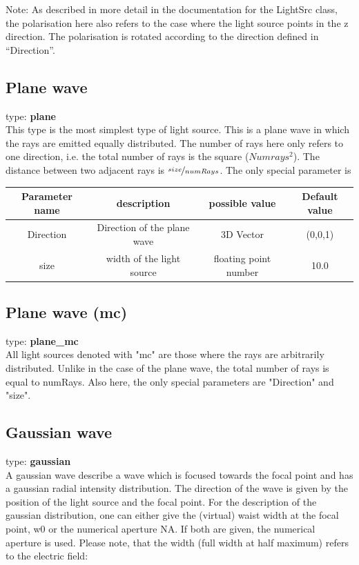 \documentclass[a4paper,html,11pt,openany]{book}
\begin{document}
 \vspace{1em} 
 Note: As described in more detail in the documentation for the LightSrc class, the polarisation here also refers to the case where the light source points in the z direction. The polarisation is rotated according to the direction defined in “Direction”. 
  \subsection{Plane wave}
  type: \textbf{plane} \\
 This type is the most simplest type of light source. This is a plane wave in which the rays are emitted equally distributed. The number of rays here only refers to one direction, i.e. the total number of rays is the square ($Numrays^2$). The distance between two adjacent rays is $\nicefrac{size}{numRays}$. The only special parameter is
  
\vspace{1em} 
  \begin{tabular}{c|c|c|c}
 Parameter name & description  & possible value & Default value \\
 \hline
 Direction & Direction of the plane wave & 3D Vector  & (0,0,1)\\
  \hline
  size & width of the light source  & floating point number & 10.0\\
 \end{tabular}
 
 \subsection{Plane wave (mc)} 
 type: \textbf{plane\_mc} \\
 All light sources denoted with "mc" are those where the rays are arbitrarily distributed. Unlike in the case of the plane wave, the total number of rays is equal to numRays. Also here, the only special parameters are "Direction" and "size". 
 
\subsection{Gaussian wave}
 type: \textbf{gaussian} \\
A gaussian wave describe a wave which is focused  towards the focal point and has a gaussian radial intensity distribution. The direction of the wave is given by the position of the light source and the focal point. For the description of the gaussian distribution, one can either give the (virtual) waist width at the focal point, w0 or the numerical aperture NA. If both are given, the numerical aperture is used. Please note, that the width (full width at half maximum) refers to the electric field: \\ 
\end{document}
